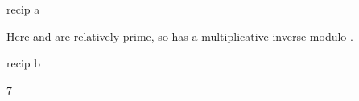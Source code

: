 {{{{{{{{{{{{{{{{\begin{xtc}
\end{xtc}
\begin{xtc}
\begin{xtccomment}
\end{xtccomment}
\begin{spadsrc}
recip a 
\end{spadsrc}
\begin{TeXOutput}
\begin{fricasmath}{4}
%
\end{fricasmath}
\end{TeXOutput}
\end{xtc}
\begin{xtc}
\begin{xtccomment}
Here  and  are relatively prime, so 
has a multiplicative inverse modulo .
\end{xtccomment}
\begin{spadsrc}
recip b 
\end{spadsrc}
\begin{TeXOutput}
\begin{fricasmath}{5}
7%
\end{fricasmath}
\end{TeXOutput}
\end{xtc}

}}}}}}}}}}}}}}}}
